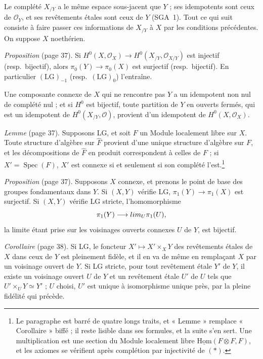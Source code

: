 \documentclass[11pt,a4paper]{article}
\begin{document}
Le complété $X_{/Y}$ a le même espace sous-jacent que $Y$ ; ses idempotents
sont ceux de $\mathcal{O}_Y$, et ses revêtements étales sont ceux de $Y$
(SGA~1). Tout ce qui suit consiste à faire passer ces informations de
$X_{/Y}$ à $X$ par les conditions précédentes. On suppose $X$ noethérien.

\emph{Proposition} (page 37). Si $H^0(X, \mathcal{O}_X) \to H^0(X_{/Y},
\mathcal{O}_{X/Y})$ est injectif (resp.\ bijectif), alors $\pi_0(Y) \to
\pi_0(X)$ est surjectif (resp.\ bijectif). En particulier
$(\mathrm{LG})_{-1}$ (resp.\ $(\mathrm{LG})_0$) l'entraîne.

Une composante connexe de $X$ qui ne rencontre pas $Y$ a un idempotent non nul
de complété nul ; et si $H^0$ est bijectif, toute partition de $Y$ en ouverts
fermés, qui est un idempotent de $H^0(X_{/Y}, \mathcal{O})$, provient d'un
idempotent de $H^0(X, \mathcal{O}_X)$.

\emph{Lemme} (page 37). Supposons LG, et soit $F$ un Module localement libre
sur $X$. Toute structure d'algèbre sur $\widehat{F}$ provient d'une unique
structure d'algèbre sur $F$, et les décompositions de $\widehat{F}$ en
produit correspondent à celles de $F$ ; si $X' = \operatorname{Spec}(F)$,
$X'$ est connexe si et seulement si son complété l'est.\footnote{Le paragraphe
est barré de quatre longs traits, et « Lemme » remplace « Corollaire » biffé ;
il reste lisible dans ses formules, et la suite s'en sert. Une multiplication
est une section du Module localement libre
$\underline{\mathrm{Hom}}(F \otimes F, F)$, et les axiomes se vérifient après
complétion par injectivité de $(*)$.}

\emph{Proposition} (page 37). Supposons $X$ connexe, et prenons le point
de base des groupes fondamentaux dans $Y$. Si $(X, Y)$ vérifie LG,
$\pi_1(Y) \to \pi_1(X)$ est surjectif. Si $(X, Y)$ vérifie LG stricte,
l'homomorphisme
\[
  \pi_1(Y) \longrightarrow \varprojlim_{U} \pi_1(U),
\]
la limite étant prise sur les voisinages ouverts connexes $U$ de $Y$, est
bijectif.

\emph{Corollaire} (page 38). Si LG, le foncteur $X' \mapsto X' \times_X Y$
des revêtements étales de $X$ dans ceux de $Y$ est pleinement fidèle, et il
en va de même en remplaçant $X$ par un voisinage ouvert de $Y$. Si LG stricte,
pour tout revêtement étale $Y'$ de $Y$, il existe un voisinage ouvert $U$ de
$Y$ et un revêtement étale $U'$ de $U$ tels que $U' \times_U Y \simeq Y'$ ;
$U$ choisi, $U'$ est unique à isomorphisme unique près, par la pleine
fidélité qui précède.
\end{document}

